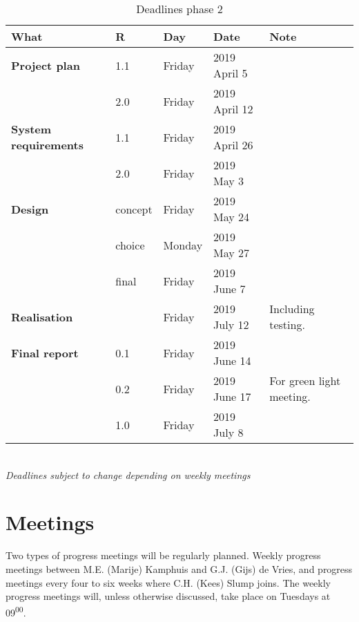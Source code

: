 \begin{table}[h!]
	\begin{tabular}{l|llll}
		\textbf{What} 		&	R	& 	Day	&	Date	&	Note \\
		\hline
		\textbf{Project plan}& 1.1	& Friday 		& 2019 April 5	&	 \\
		\rowcolor{Gray}
		 	&	2.0 	&	 Friday & 2019 April 12 & \\
		 	\hline
		\textbf{System requirements} & 1.1 & Friday & 2019 April 26 & \\
		\rowcolor{Gray}
		 & 2.0 & Friday & 2019 May 3 & \\
		\hline
		\textbf{Design} & concept & Friday & 2019 May 24 & \\
		\rowcolor{Gray}
		 & choice & Monday & 2019 May 27 &  \\
		 & final  & Friday & 2019 June 7 & \\
		 \rowcolor{Gray}
		 \hline
		 \textbf{Realisation} & & Friday & 2019 July 12 & Including testing.\\
		 \hline
		 \textbf{Final report} & 0.1 & Friday & 2019 June 14 & \\
		 \rowcolor{Gray}
		 & 0.2 & Friday & 2019 June 17 & For green light meeting.\\
		 & 1.0 & Friday & 2019 July 8 & \\
		 \hline
	\end{tabular} \\
	\textit{Deadlines subject to change depending on weekly meetings}
	\caption{Deadlines phase 2}
	\label{tab:deadlines2}
\end{table}

\section{Meetings}
Two types of progress meetings will be regularly planned. Weekly progress meetings between M.E. (Marije) Kamphuis and G.J. (Gijs) de Vries, and progress meetings every four to six weeks where C.H. (Kees) Slump joins. The weekly progress meetings will, unless otherwise discussed, take place on Tuesdays at 09\textsuperscript{00}.

